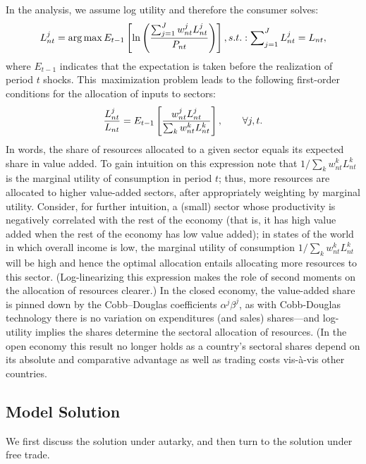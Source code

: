 \documentclass[12pt]{article}
\begin{document}
In the analysis, we assume log utility and therefore the consumer solves: 
\begin{equation}
L_{nt}^{j}=\arg \max E_{t-1}\left[ \ln \left( \frac{%
\sum_{j=1}^{J}w_{nt}^{j}L_{nt}^{j}}{P_{nt}}\right) \right]
,s.t.:\sum\nolimits_{j=1}^{J}L_{nt}^{j}=L_{nt},  \label{eq:log:utility}
\end{equation}%
where $E_{t-1}$ indicates that the expectation is taken before the
realization of period $t$ shocks. This\ maximization problem leads to the
following first-order conditions for the allocation of inputs to sectors: 
\begin{equation}
\frac{L_{nt}^{j}}{L_{nt}}=E_{t-1}\left[ \frac{w_{nt}^{j}L_{nt}^{j}}{%
\sum_{k}w_{nt}^{k}L_{nt}^{k}}\right] ,\qquad \forall j,t.  \label{eq:FOC}
\end{equation}%
In words, the share of resources allocated to a given sector equals its
expected share in value added. To gain intuition on this expression note
that $1/\sum_{k}w_{nt}^{k}L_{nt}^{k}$ is the marginal utility of consumption
in period $t$; thus, more resources are allocated to higher value-added
sectors, after appropriately weighting by marginal utility. Consider, for
further intuition, a (small) sector whose productivity is negatively
correlated with the rest of the economy (that is, it has high value added
when the rest of the economy has low value added); in states of the world in
which overall income is low, the marginal utility of consumption $%
1/\sum_{k}w_{nt}^{k}L_{nt}^{k}$ will be high and hence the optimal
allocation entails allocating more resources to this sector.
(Log-linearizing this expression makes the role of second moments on the
allocation of resources clearer.) In the closed economy, the value-added
share is pinned down by the Cobb--Douglas coefficients $\alpha ^{j}\beta
^{j} $, as with Cobb-Douglas technology there is no variation on
expenditures (and sales) shares---and log-utility implies the shares
determine the sectoral allocation of resources. (In the open economy this
result no longer holds as a country's sectoral shares depend on its absolute
and comparative advantage as well as trading costs vis-\`{a}-vis other
countries.

\subsection{Model Solution}

We first discuss the solution under autarky, and then turn to the solution
under free trade.
\end{document}
